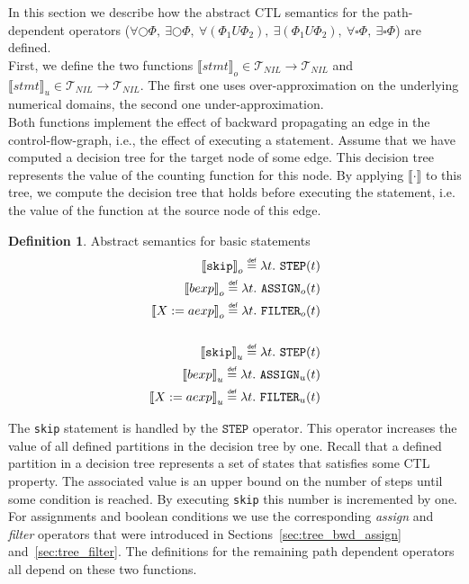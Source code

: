 \documentclass[11pt,a4paper,titlepage]{article}
\theoremstyle{definition}
\newtheorem{definition}{Definition}[section]
\newcommand\eqdef{\mathrel{\overset{\makebox[0pt]{\mbox{\normalfont\tiny\sffamily def}}}{=}}}
\begin{document}
In this section we describe how the abstract CTL semantics for the path-dependent operators 
($\forall\bigcirc\Phi,\ \exists\bigcirc\Phi,\ \forall(\Phi_1 U \Phi_2),\ \exists(\Phi_1 U \Phi_2),\ \forall\square\Phi,\ \exists\square\Phi$)
are defined.\\

First, we define the two functions ${\llbracket stmt \rrbracket}_o \in \mathcal{T}_{NIL} \rightarrow \mathcal{T}_{NIL}$
and ${\llbracket stmt \rrbracket}_u \in \mathcal{T}_{NIL} \rightarrow \mathcal{T}_{NIL}$. 
The first one uses over-approximation on the underlying numerical domains, the second one under-approximation.\\

Both functions implement the effect of backward propagating an edge 
in the control-flow-graph, i.e., the effect of executing a statement. 
Assume that we have computed a decision tree for the target node of some edge. 
This decision tree represents the value of the counting function for this node. 
By applying ${\llbracket \cdot \rrbracket}$ to this tree, we compute the decision tree 
that holds before executing the statement, i.e.\, the value of the function at the source node of this edge.



\begin{definition}\label{def:basic_expression_transformer}
    Abstract semantics for basic statements
    \begin{align*}
        {\llbracket \mathtt{skip} \rrbracket}_o \eqdef \lambda t. \ \mathtt{STEP}(t)\\
        {\llbracket bexp \rrbracket}_o \eqdef \lambda t. \ \mathtt{ASSIGN}_o(t)\\
        {\llbracket X := aexp \rrbracket}_o \eqdef \lambda t. \ \mathtt{FILTER}_o(t)\\
        \\
        {\llbracket \mathtt{skip} \rrbracket}_u \eqdef \lambda t. \ \mathtt{STEP}(t)\\
        {\llbracket bexp \rrbracket}_u \eqdef \lambda t. \ \mathtt{ASSIGN}_u(t)\\
        {\llbracket X := aexp \rrbracket}_u \eqdef \lambda t. \ \mathtt{FILTER}_u(t)\\
    \end{align*}
\end{definition}

The \texttt{skip} statement is handled by the $\mathtt{STEP}$ operator. This operator increases the value of all defined
partitions in the decision tree by one. Recall that a defined partition in a decision tree represents a set of states that satisfies 
some CTL property. The associated value is an upper bound on the number of steps until some condition is reached. 
By executing \texttt{skip} this number is incremented by one.
For assignments and boolean conditions we use the corresponding \textit{assign} and \textit{filter}
operators that were introduced in Sections~\ref{sec:tree_bwd_assign} and~\ref{sec:tree_filter}.
The definitions for the remaining path dependent operators all depend on these two functions.
\end{document}
